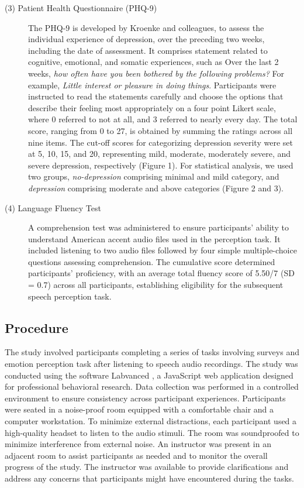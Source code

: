 \documentclass{Interspeech2024}
\begin{document}
\begin{description}
\item[(3) Patient Health Questionnaire (PHQ-9)] 
 
The PHQ-9 is developed by Kroenke and colleagues, \cite{kroenke2001phq}  to assess the individual experience of depression, over the preceding two weeks, including the date of assessment. It comprises statement related to cognitive, emotional, and somatic experiences, such as Over the last 2 weeks, \textit{how often have you been bothered by the following problems?} For example, \textit{Little interest or pleasure in doing things}. Participants were instructed to read the statements carefully and choose the options that describe their feeling most appropriately on a four point Likert scale, where 0 referred to not at all, and 3 referred to nearly every day. The total score, ranging from 0 to 27, is obtained by summing the ratings across all nine items. The cut-off scores for categorizing depression severity were set at 5, 10, 15, and 20, representing mild, moderate, moderately severe, and severe depression, respectively (Figure 1). For statistical analysis, we used two groups, \textit{no-depression} comprising minimal and mild category, and \textit{depression} comprising moderate and above categories (Figure 2 and 3).
\item [(4) Language Fluency Test] A comprehension test was administered to ensure participants' ability to understand American accent audio files used in the perception task. It included listening to two audio files followed by four simple multiple-choice questions assessing comprehension. The cumulative score determined participants' proficiency, with an average total fluency score of 5.50/7 (SD = 0.7) across all participants, establishing eligibility for the subsequent speech perception task.
    \vspace{0.3em}

    
\end{description}


\subsection{Procedure} 
The study involved participants completing a series of tasks involving surveys and emotion perception task after listening to speech audio recordings. The study was conducted using the software Labvanced \cite{finger2017labvanced}, a JavaScript web application designed for professional behavioral research. 
Data collection was performed in a controlled environment to ensure consistency across participant experiences. Participants were seated in a noise-proof room equipped with a comfortable chair and a computer workstation. To minimize external distractions, each participant used a high-quality headset to listen to the audio stimuli. The room was soundproofed to minimize interference from external noise.
An instructor was present in an adjacent room to assist participants as needed and to monitor the overall progress of the study. The instructor was available to provide clarifications and address any concerns that participants might have encountered during the tasks.
\end{document}
